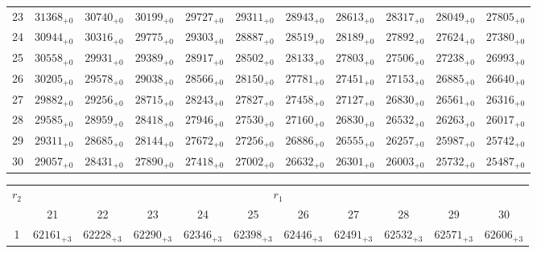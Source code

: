 \documentclass[10pt, a4paper]{article}
\begin{document}
\begin{center}
\begin{tabular}{c || c c c c c | c c c c c}
        23 & \({31368}_{+0}\) & \({30740}_{+0}\) & \({30199}_{+0}\) & \({29727}_{+0}\) & \({29311}_{+0}\) & \({28943}_{+0}\) & \({28613}_{+0}\) & \({28317}_{+0}\) & \({28049}_{+0}\) & \({27805}_{+0}\)\\
        24 & \({30944}_{+0}\) & \({30316}_{+0}\) & \({29775}_{+0}\) & \({29303}_{+0}\) & \({28887}_{+0}\) & \({28519}_{+0}\) & \({28189}_{+0}\) & \({27892}_{+0}\) & \({27624}_{+0}\) & \({27380}_{+0}\)\\
        25 & \({30558}_{+0}\) & \({29931}_{+0}\) & \({29389}_{+0}\) & \({28917}_{+0}\) & \({28502}_{+0}\) & \({28133}_{+0}\) & \({27803}_{+0}\) & \({27506}_{+0}\) & \({27238}_{+0}\) & \({26993}_{+0}\)\\
        \hline
        26 & \({30205}_{+0}\) & \({29578}_{+0}\) & \({29038}_{+0}\) & \({28566}_{+0}\) & \({28150}_{+0}\) & \({27781}_{+0}\) & \({27451}_{+0}\) & \({27153}_{+0}\) & \({26885}_{+0}\) & \({26640}_{+0}\)\\
        27 & \({29882}_{+0}\) & \({29256}_{+0}\) & \({28715}_{+0}\) & \({28243}_{+0}\) & \({27827}_{+0}\) & \({27458}_{+0}\) & \({27127}_{+0}\) & \({26830}_{+0}\) & \({26561}_{+0}\) & \({26316}_{+0}\)\\
        28 & \({29585}_{+0}\) & \({28959}_{+0}\) & \({28418}_{+0}\) & \({27946}_{+0}\) & \({27530}_{+0}\) & \({27160}_{+0}\) & \({26830}_{+0}\) & \({26532}_{+0}\) & \({26263}_{+0}\) & \({26017}_{+0}\)\\
        29 & \({29311}_{+0}\) & \({28685}_{+0}\) & \({28144}_{+0}\) & \({27672}_{+0}\) & \({27256}_{+0}\) & \({26886}_{+0}\) & \({26555}_{+0}\) & \({26257}_{+0}\) & \({25987}_{+0}\) & \({25742}_{+0}\)\\
        30 & \({29057}_{+0}\) & \({28431}_{+0}\) & \({27890}_{+0}\) & \({27418}_{+0}\) & \({27002}_{+0}\) & \({26632}_{+0}\) & \({26301}_{+0}\) & \({26003}_{+0}\) & \({25732}_{+0}\) & \({25487}_{+0}\)\\
        \hline
    \end{tabular}
    \pagebreak
    \begin{tabular}{c || c c c c c | c c c c c}
        \multirow{2}{*}{\(r_2\)} & \multicolumn{10}{c}{\(r_1\)} \\
        & 21 & 22 & 23 & 24 & 25 & 26 & 27 & 28 & 29 & 30\\
        \hline\hline
        1 & \({62161}_{+3}\) & \({62228}_{+3}\) & \({62290}_{+3}\) & \({62346}_{+3}\) & \({62398}_{+3}\) & \({62446}_{+3}\) & \({62491}_{+3}\) & \({62532}_{+3}\) & \({62571}_{+3}\) & \({62606}_{+3}\)\\

\end{tabular}
\end{center}
\end{document}
